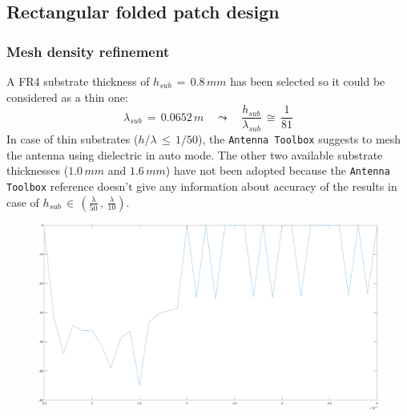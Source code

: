 \documentclass[12pt,a4paper]{book}
\begin{document}
{\subsection*{\selectfont\color{Turquoise}Rectangular folded patch design}
\subsubsection*{\selectfont\color{Turquoise}Mesh density refinement}
A FR4 substrate thickness of $h_{sub}\,=\,0.8\,mm$  has been selected so it could be considered as a thin one:
\[\lambda_{sub}\,=\,0.0652\,m\quad \leadsto\quad \frac{h_{sub}}{\lambda_{sub}}\,\cong\,\frac{1}{81}\]
In case of thin substrates ($h/\lambda\,\leq\,1/50$),  the \texttt{\color{Mahogany}Antenna Toolbox} suggests to mesh the antenna using dielectric in auto mode. The other two available substrate thicknesses ($1.0\,mm$ and $1.6\,mm$) have not been adopted because the \texttt{\color{Mahogany}Antenna Toolbox} reference doesn't give any information about accuracy of the results in case of $h_{sub}\,\in\,\left(\frac{\lambda}{50}\,,\,\frac{\lambda}{10}\right)$. 
\begin{center}
\begin{figure}[h]
\includegraphics[scale=0.3]{mesh_levels.png}
\end{figure}
\end{center}
}
\end{document}
